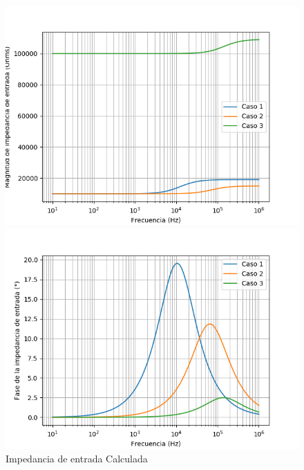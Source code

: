 \begin{figure}[H]
\begin{centering}
\includegraphics[scale=0.5]{../Ex1/iA/Resources1a/zinpm}
\par\end{centering}
\begin{centering}
\includegraphics[scale=0.5]{../Ex1/iA/Resources1a/zinpp}
\par\end{centering}
\caption{Impedancia de entrada Calculada}
\label{1_a_3}

\end{figure}

